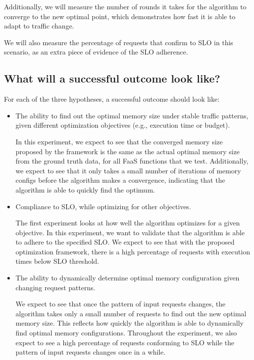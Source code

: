 \documentclass[conference]{IEEEtran}
\begin{document}
\begin{itemize}
Additionally, we will measure the number of rounds it takes for the algorithm to converge to the new optimal point, which demonstrates how fast it is able to adapt to traffic change.

We will also measure the percentage of requests that confirm to SLO in this scenario, as an extra piece of evidence of the SLO adherence.

\end{itemize}


\subsection{What will a successful outcome look like?}
For each of the three hypotheses, a successful outcome should look like:
\begin{itemize}
\item The ability to find out the optimal memory size under stable traffic patterns, given different optimization objectives (e.g., execution time or budget).

In this experiment, we expect to see that the converged memory size proposed by the framework is the same as the actual optimal memory size from the ground truth data, for all FaaS functions that we test. Additionally, we expect to see that it only takes a small number of iterations of memory configs before the algorithm makes a convergence, indicating that the algorithm is able to quickly find the optimum.

\item Compliance to SLO, while optimizing for other objectives.

The first experiment looks at how well the algorithm optimizes for a given objective. In this experiment, we want to validate that the algorithm is able to adhere to the specified SLO. We expect to see that with the proposed optimization framework, there is a high percentage of requests with execution times below SLO threshold. 

\item The ability to dynamically determine optimal memory configuration given changing request patterns.

We expect to see that once the pattern of input requests changes, the algorithm takes only a small number of requests to find out the new optimal memory size. This reflects how quickly the algorithm is able to dynamically find optimal memory configurations. Throughout the experiment, we also expect to see a high percentage of requests conforming to SLO while the pattern of input requests changes once in a while.

\end{itemize}
\end{document}
